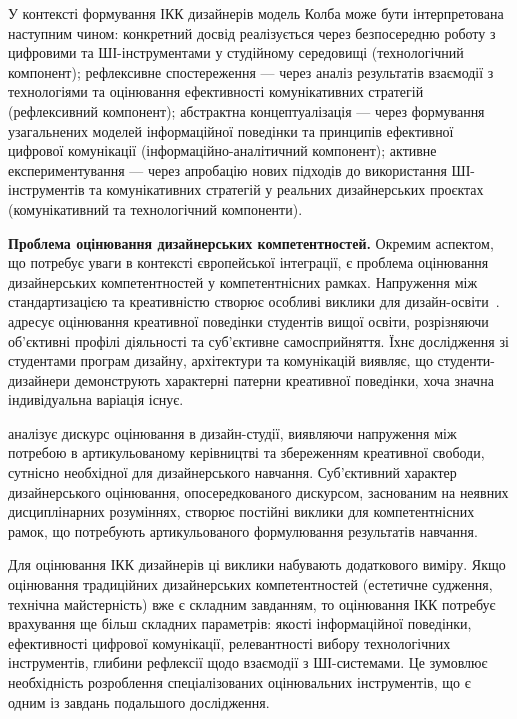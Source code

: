 У контексті формування ІКК дизайнерів модель Колба може бути інтерпретована наступним чином: конкретний досвід реалізується через безпосередню роботу з цифровими та ШІ-інструментами у студійному середовищі (технологічний компонент); рефлексивне спостереження --- через аналіз результатів взаємодії з технологіями та оцінювання ефективності комунікативних стратегій (рефлексивний компонент); абстрактна концептуалізація --- через формування узагальнених моделей інформаційної поведінки та принципів ефективної цифрової комунікації (інформаційно-аналітичний компонент); активне експериментування --- через апробацію нових підходів до використання ШІ-інструментів та комунікативних стратегій у реальних дизайнерських проєктах (комунікативний та технологічний компоненти).

\textbf{Проблема оцінювання дизайнерських компетентностей.} Окремим аспектом, що потребує уваги в контексті європейської інтеграції, є проблема оцінювання дизайнерських компетентностей у компетентнісних рамках. Напруження між стандартизацією та креативністю створює особливі виклики для дизайн-освіти~\cite{Weldon2009168}. \citet{AlvarezIcaza2024} адресує оцінювання креативної поведінки студентів вищої освіти, розрізняючи об'єктивні профілі діяльності та суб'єктивне самосприйняття. Їхнє дослідження зі студентами програм дизайну, архітектури та комунікацій виявляє, що студенти-дизайнери демонструють характерні патерни креативної поведінки, хоча значна індивідуальна варіація існує.

\citet{Ardington2017157} аналізує дискурс оцінювання в дизайн-студії, виявляючи напруження між потребою в артикульованому керівництві та збереженням креативної свободи, сутнісно необхідної для дизайнерського навчання. Суб'єктивний характер дизайнерського оцінювання, опосередкованого дискурсом, заснованим на неявних дисциплінарних розуміннях, створює постійні виклики для компетентнісних рамок, що потребують артикульованого формулювання результатів навчання.

Для оцінювання ІКК дизайнерів ці виклики набувають додаткового виміру. Якщо оцінювання традиційних дизайнерських компетентностей (естетичне судження, технічна майстерність) вже є складним завданням, то оцінювання ІКК потребує врахування ще більш складних параметрів: якості інформаційної поведінки, ефективності цифрової комунікації, релевантності вибору технологічних інструментів, глибини рефлексії щодо взаємодії з ШІ-системами. Це зумовлює необхідність розроблення спеціалізованих оцінювальних інструментів, що є одним із завдань подальшого дослідження.

